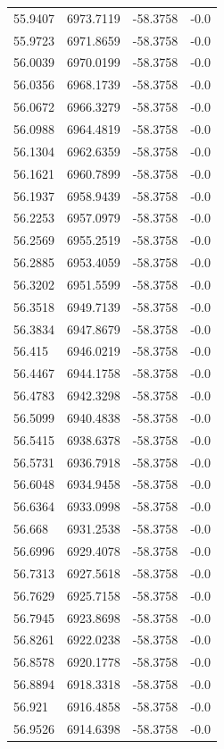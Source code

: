 \begin{table}[H]
\begin{tabular}{llll}
55.9407 & 6973.7119 & -58.3758 & -0.0 \\
55.9723 & 6971.8659 & -58.3758 & -0.0 \\
56.0039 & 6970.0199 & -58.3758 & -0.0 \\
56.0356 & 6968.1739 & -58.3758 & -0.0 \\
56.0672 & 6966.3279 & -58.3758 & -0.0 \\
56.0988 & 6964.4819 & -58.3758 & -0.0 \\
56.1304 & 6962.6359 & -58.3758 & -0.0 \\
56.1621 & 6960.7899 & -58.3758 & -0.0 \\
56.1937 & 6958.9439 & -58.3758 & -0.0 \\
56.2253 & 6957.0979 & -58.3758 & -0.0 \\
56.2569 & 6955.2519 & -58.3758 & -0.0 \\
56.2885 & 6953.4059 & -58.3758 & -0.0 \\
56.3202 & 6951.5599 & -58.3758 & -0.0 \\
56.3518 & 6949.7139 & -58.3758 & -0.0 \\
56.3834 & 6947.8679 & -58.3758 & -0.0 \\
56.415 & 6946.0219 & -58.3758 & -0.0 \\
56.4467 & 6944.1758 & -58.3758 & -0.0 \\
56.4783 & 6942.3298 & -58.3758 & -0.0 \\
56.5099 & 6940.4838 & -58.3758 & -0.0 \\
56.5415 & 6938.6378 & -58.3758 & -0.0 \\
56.5731 & 6936.7918 & -58.3758 & -0.0 \\
56.6048 & 6934.9458 & -58.3758 & -0.0 \\
56.6364 & 6933.0998 & -58.3758 & -0.0 \\
56.668 & 6931.2538 & -58.3758 & -0.0 \\
56.6996 & 6929.4078 & -58.3758 & -0.0 \\
56.7313 & 6927.5618 & -58.3758 & -0.0 \\
56.7629 & 6925.7158 & -58.3758 & -0.0 \\
56.7945 & 6923.8698 & -58.3758 & -0.0 \\
56.8261 & 6922.0238 & -58.3758 & -0.0 \\
56.8578 & 6920.1778 & -58.3758 & -0.0 \\
56.8894 & 6918.3318 & -58.3758 & -0.0 \\
56.921 & 6916.4858 & -58.3758 & -0.0 \\
56.9526 & 6914.6398 & -58.3758 & -0.0 \\

\end{tabular}
\end{table}
